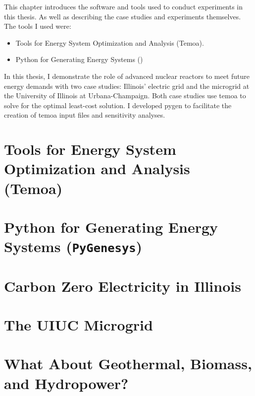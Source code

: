 This chapter introduces the software and tools used to conduct experiments in this
thesis. As well as describing the case studies and experiments themselves.
The tools I used were:
\begin{itemize}
  \item Tools for Energy System Optimization and Analysis (Temoa).
  \item Python for Generating Energy Systems (\pygen)
\end{itemize}
In this thesis, I demonstrate the role of advanced nuclear reactors to meet future
energy demands with two case studies: Illinois’ electric grid and the microgrid
at the University of Illinois at Urbana-Champaign. Both case studies use \gls{temoa}
to solve for the optimal least-cost solution. I developed \gls{pygen} to
facilitate the creation of \gls{temoa} input files and sensitivity analyses.

\section{Tools for Energy System Optimization and Analysis (Temoa)}


\section{Python for Generating Energy Systems (\texttt{PyGenesys})}



\section{Carbon Zero Electricity in Illinois}
\label{section:ilmodel}


\section{The UIUC Microgrid}
\label{section:uiucmodel}


\section{What About Geothermal, Biomass, and Hydropower?}
\label{section:alt_firm}


